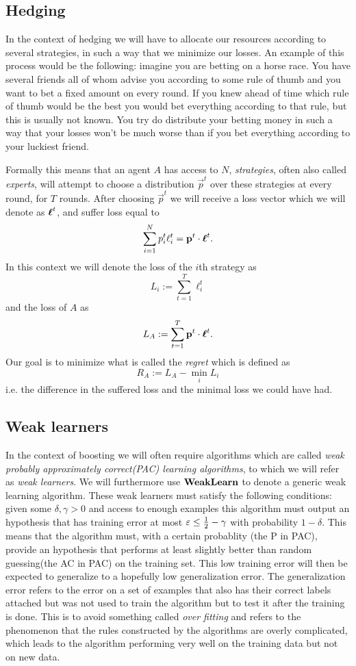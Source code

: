 \subsection{Hedging}
\label{subsec:hedging}
In the context of hedging we will have to allocate our resources according to several strategies, in such a way that we minimize our losses. An example of this process would be the following: imagine you are betting on a horse race. You have several friends all of whom advise you according to some rule of thumb and you want to bet a fixed amount on every round. If you knew ahead of time which rule of thumb would be the best you would bet everything according to that rule, but this is usually not known. You try do distribute your betting money in such a way that your losses won't be much worse than if you bet everything according to your luckiest friend. 
\par Formally this means that an agent $A$ has access to $N$, \textit{strategies}, often also called \textit{experts}, will attempt to choose a distribution $\vec p^t$ over these strategies at every round, for $T$ rounds. After choosing $\vec p^t$ we will receive a loss vector which we will denote as $\boldsymbol\ell^t$, and suffer loss equal to $$\sum_{i=1}^N p^t_i\ell_i^t = \mathbf{p}^t \cdot \boldsymbol\ell^t.$$ In this context we will denote the loss of the $i$th strategy as $$L_i:= \sum_{t=1}^T \ell^t_i$$ and the loss of $A$ as $$L_A := \sum_{t=1}^T \mathbf{p}^t \cdot \boldsymbol\ell^t.$$ Our goal is to minimize what is called the \textit{regret} which is defined as $$R_A:=L_A - \min_i L_i$$ i.e. the difference in the suffered loss and the minimal loss we could have had. 

\subsection{Weak learners}
\label{subsec:weak}
In the context of boosting we will often require algorithms which are called \textit{weak probably approximately correct(PAC) learning algorithms}\cite{Freund1997}, to which we will refer as \textit{weak learners}. We will furthermore use $\textbf{WeakLearn}$ to denote a generic weak learning algorithm. These weak learners must satisfy the following conditions: given some $\delta,\gamma >0$ and access to enough examples this algorithm must output an hypothesis that has training error at most $\varepsilon \leq \frac12 - \gamma$ with probability $1-\delta$. This means that the algorithm must, with a certain probablity (the P in PAC), provide an hypothesis that performs at least slightly better than random guessing(the AC in PAC) on the training set. This low training error will then be expected to generalize to a hopefully low generalization error. The generalization error refers to the error on a set of examples that also has their correct labels attached but was not used to train the algorithm but to test it after the training is done. This is to avoid something called \textit{over fitting} and refers to the phenomenon that the rules constructed by the algorithms are overly complicated, which leads to the algorithm performing very well on the training data but not on new data. 

